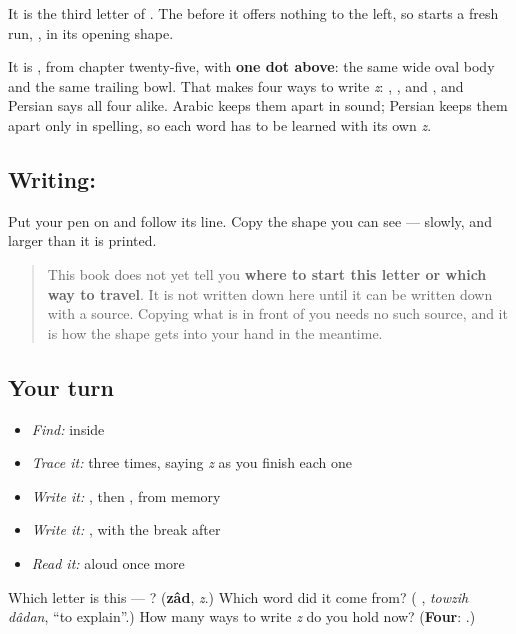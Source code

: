 It is the third letter of \textbf{}. The \textbf{} before it offers nothing to the left, so \textbf{} starts a fresh run, \textbf{}, in its opening shape.

It is \textbf{}, from chapter twenty-five, with \textbf{one dot above}: the same wide oval body and the same trailing bowl. That makes four ways to write \emph{z}: \textbf{}, \textbf{}, \textbf{} and \textbf{}, and Persian says all four alike. Arabic keeps them apart in sound; Persian keeps them apart only in spelling, so each word has to be learned with its own \emph{z}.

\subsection*{Writing: }
Put your pen on  and follow its line. Copy the shape you can see — slowly, and larger than it is printed.

\begin{quote}
This book does not yet tell you \textbf{where to start this letter or which way to travel}. It is not written down here until it can be written down with a source. Copying what is in front of you needs no such source, and it is how the shape gets into your hand in the meantime.
\end{quote}

\subsection*{Your turn}
\begin{itemize}
\raggedright
  \item \emph{Find:}  inside \textbf{}
  \item \emph{Trace it:}  three times, saying \emph{z} as you finish each one
  \item \emph{Write it:} , then , from memory
  \item \emph{Write it:} \textbf{}, with the break after 
  \item \emph{Read it:} \textbf{ } aloud once more
\end{itemize}

\begin{tcolorbox}[breakable,colback=teal!4,colframe=teal!35!black,title={Before you move on}]
Which letter is this — ? (\textbf{zâd}, \emph{z}.) Which word did it come from? (\textbf{ }, \emph{towzih dâdan}, \textquotedblleft{}to explain\textquotedblright{}.) How many ways to write \emph{z} do you hold now? (\textbf{Four}:    .)
\end{tcolorbox}
